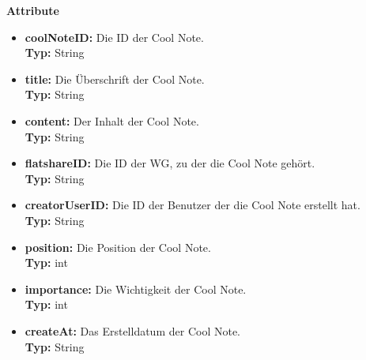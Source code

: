 	\textbf{Attribute}
	\begin{itemize}
		\item \textbf{coolNoteID:} Die ID der Cool Note. \\
		\textbf{Typ:} String
		\item \textbf{title:} Die Überschrift der Cool Note. \\
		\textbf{Typ:} String
		\item \textbf{content:} Der Inhalt der Cool Note. \\
		\textbf{Typ:} String
		\item \textbf{flatshareID:} Die ID der WG, zu der die Cool Note gehört. \\
		\textbf{Typ:} String
		\item \textbf{creatorUserID:} Die ID der Benutzer der die Cool Note erstellt hat. \\
		\textbf{Typ:} String
		\item \textbf{position:} Die Position der Cool Note. \\
		\textbf{Typ:} int
		\item \textbf{importance:} Die Wichtigkeit der Cool Note. \\
		\textbf{Typ:} int
		\item \textbf{createAt:} Das Erstelldatum der Cool Note.\\
		\textbf{Typ:} String
	\end{itemize}

